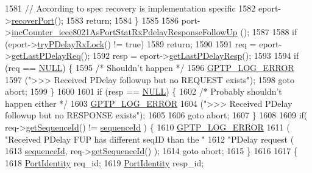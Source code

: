 \begin{DoxyCode}
1581         \textcolor{comment}{// According to spec recovery is implementation specific}
1582         eport->\hyperlink{class_ether_port_adbdec0aadf109d5cff2279304ad73cd1}{recoverPort}();
1583         \textcolor{keywordflow}{return};
1584     \}
1585 
1586     port->\hyperlink{class_common_port_a616fe4534facbdb2d3e5296d5a787923}{incCounter\_ieee8021AsPortStatRxPdelayResponseFollowUp}
      ();
1587 
1588     \textcolor{keywordflow}{if} (eport->\hyperlink{class_ether_port_a138c4cc138f701511969440550ddf6fb}{tryPDelayRxLock}() != \textcolor{keyword}{true})
1589         \textcolor{keywordflow}{return};
1590 
1591     req = eport->\hyperlink{class_ether_port_a0a0c05dbfb82e5eeacca5a4b05153c6c}{getLastPDelayReq}();
1592     resp = eport->\hyperlink{class_ether_port_a3afa6852a50e5e448a00418873a59eb1}{getLastPDelayResp}();
1593 
1594     \textcolor{keywordflow}{if} (req == \hyperlink{openavb__types__base__pub_8h_a070d2ce7b6bb7e5c05602aa8c308d0c4}{NULL}) \{
1595         \textcolor{comment}{/* Shouldn't happen */}
1596         \hyperlink{gptp__log_8hpp_afefbb1009717c128012bfeed94842987}{GPTP\_LOG\_ERROR}
1597             (\textcolor{stringliteral}{">>> Received PDelay followup but no REQUEST exists"});
1598         \textcolor{keywordflow}{goto} abort;
1599     \}
1600 
1601     \textcolor{keywordflow}{if} (resp == \hyperlink{openavb__types__base__pub_8h_a070d2ce7b6bb7e5c05602aa8c308d0c4}{NULL}) \{
1602         \textcolor{comment}{/* Probably shouldn't happen either */}
1603         \hyperlink{gptp__log_8hpp_afefbb1009717c128012bfeed94842987}{GPTP\_LOG\_ERROR}
1604             (\textcolor{stringliteral}{">>> Received PDelay followup but no RESPONSE exists"});
1605 
1606         \textcolor{keywordflow}{goto} abort;
1607     \}
1608 
1609     \textcolor{keywordflow}{if}( req->\hyperlink{class_p_t_p_message_common_abd5cac5701120cbbfc56129b31fa801f}{getSequenceId}() != \hyperlink{class_p_t_p_message_common_a189710d5cff10c03f77d72a276a5f58e}{sequenceId} ) \{
1610         \hyperlink{gptp__log_8hpp_afefbb1009717c128012bfeed94842987}{GPTP\_LOG\_ERROR}
1611             ( \textcolor{stringliteral}{"Received PDelay FUP has different seqID than the "}
1612               \textcolor{stringliteral}{"PDelay request (%
1613               \hyperlink{class_p_t_p_message_common_a189710d5cff10c03f77d72a276a5f58e}{sequenceId}, req->\hyperlink{class_p_t_p_message_common_abd5cac5701120cbbfc56129b31fa801f}{getSequenceId}() );
1614         \textcolor{keywordflow}{goto} abort;
1615     \}
1616 
1617     \{
1618         \hyperlink{class_port_identity}{PortIdentity} req\_id;
1619         \hyperlink{class_port_identity}{PortIdentity} resp\_id;
}
\end{DoxyCode}
